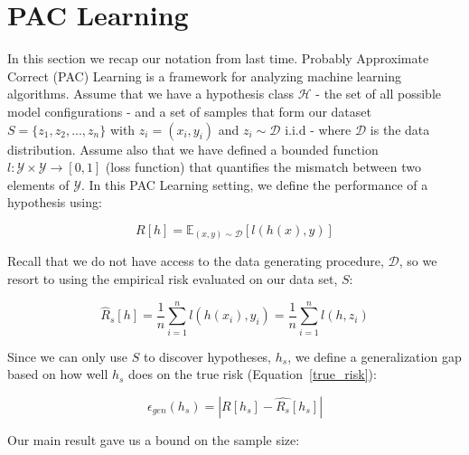 \documentclass{article}
\begin{document}
\section{PAC Learning}
In this section we recap our notation from last time. Probably Approximate Correct (PAC) Learning is a framework for analyzing machine learning algorithms. Assume that we have a hypothesis class $\mathcal{H}$ - the set of all possible model configurations - and a set of samples that form our dataset $S = \{z_1, z_2, ..., z_n\}$ with $z_i = (x_i, y_i)$ and $z_i \sim \mathcal{D}$ i.i.d - where $\mathcal{D}$ is the data distribution. Assume also that we have defined a bounded function $l: \mathcal{Y} \times \mathcal{Y} \rightarrow [0, 1]$ (loss function) that quantifies the mismatch between two elements of $\mathcal{Y}$. In this PAC Learning setting, we define the performance of a hypothesis using:
\begin{defn}[Risk]
\[
	R[h] = \mathbb{E}_{(x, y) \sim \mathcal{D}}[l(h(x), y)]
\]
\label{true_risk}
\end{defn}
Recall that we do not have access to the data generating procedure, $\mathcal{D}$, so we resort to using the empirical risk evaluated on our data set, $S$:
\begin{defn}
\[
	\hat{R}_s[h] = \frac{1}{n}\sum_{i=1}^{n} l(h(x_i), y_i) = \frac{1}{n}\sum_{i=1}^{n} l(h,z_i)
\]
\end{defn}
Since we can only use $S$ to discover hypotheses, $h_s$, we define a generalization gap based on how well $h_s$ does on the true risk (Equation~\ref{true_risk}):
\begin{defn}
\[
	\epsilon_{gen}(h_s) = | R[h_s] - \hat{R_s}[h_s] |
\]
\end{defn}
Our main result gave us a bound on the sample size:


\end{document}

